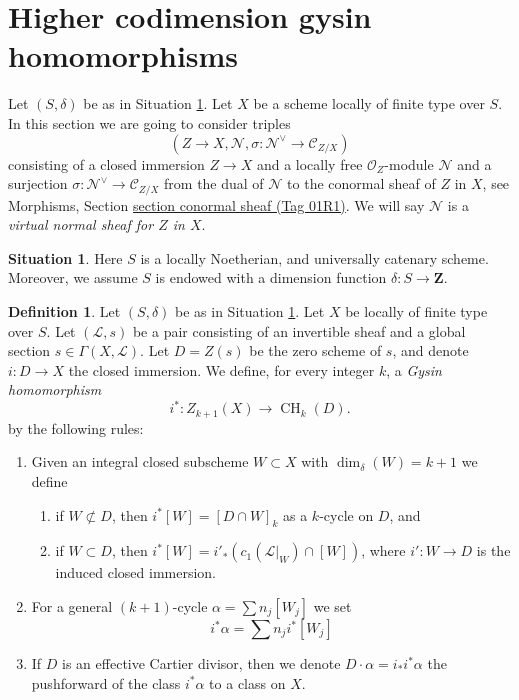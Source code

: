 \documentclass{amsart}
\theoremstyle{plain}
\theoremstyle{definition}
\newtheorem{definition}[subsection]{Definition}
\newtheorem{situation}[subsection]{Situation}
\theoremstyle{remark}
\numberwithin{equation}{subsection}
\def\CH{\mathop{\mathrm{CH}}\nolimits}
\begin{document}
\section{Higher codimension gysin homomorphisms}
\label{section-gysin-higher-codimension}

\noindent
Let $(S, \delta)$ be as in Situation \ref{situation-setup}. Let $X$ be a scheme
locally of finite type over $S$. In this section we are going to consider
triples
$$
(Z \to X, \mathcal{N}, \sigma : \mathcal{N}^\vee \to \mathcal{C}_{Z/X})
$$
consisting of a closed immersion $Z \to X$ and a locally free
$\mathcal{O}_Z$-module $\mathcal{N}$ and a surjection
$\sigma : \mathcal{N}^\vee \to \mathcal{C}_{Z/X}$ from the dual
of $\mathcal{N}$ to the conormal sheaf of $Z$ in $X$, see
Morphisms, Section \href{https://stacks.math.columbia.edu/tag/01R1}{section conormal sheaf (Tag 01R1)}.
We will say
$\mathcal{N}$ is a {\it virtual normal sheaf for $Z$ in $X$}.



\begin{situation}
\label{situation-setup}
Here $S$ is a locally Noetherian, and universally catenary scheme.
Moreover, we assume $S$ is endowed with a dimension function
$\delta : S \longrightarrow \mathbf{Z}$.
\end{situation}

\begin{definition}
\label{definition-gysin-homomorphism}
Let $(S, \delta)$ be as in Situation \ref{situation-setup}.
Let $X$ be locally of finite type over $S$.
Let $(\mathcal{L}, s)$ be a pair consisting of an invertible
sheaf and a global section $s \in \Gamma(X, \mathcal{L})$.
Let $D = Z(s)$ be the zero scheme of $s$, and
denote $i : D \to X$ the closed immersion.
We define, for every integer $k$, a {\it Gysin homomorphism}
$$
i^* : Z_{k + 1}(X) \to \CH_k(D).
$$
by the following rules:
\begin{enumerate}
\item Given an integral closed subscheme $W \subset X$ with
$\dim_\delta(W) = k + 1$ we define
\begin{enumerate}
\item if $W \not \subset D$, then $i^*[W] = [D \cap W]_k$ as a
$k$-cycle on $D$, and
\item if $W \subset D$, then
$i^*[W] = i'_*(c_1(\mathcal{L}|_W) \cap [W])$,
where $i' : W \to D$ is the induced closed immersion.
\end{enumerate}
\item For a general $(k + 1)$-cycle $\alpha = \sum n_j[W_j]$
we set
$$
i^*\alpha = \sum n_j i^*[W_j]
$$
\item If $D$ is an effective Cartier divisor, then we denote
$D \cdot \alpha = i_*i^*\alpha$ the pushforward of the class $i^*\alpha$
to a class on $X$.
\end{enumerate}
\end{definition}
\end{document}
